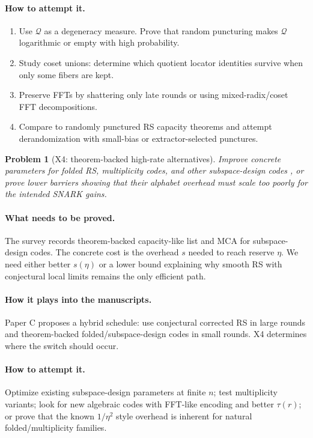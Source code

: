 \documentclass[11pt]{article}
\newtheorem{problem}[theorem]{Problem}
\theoremstyle{definition}
\theoremstyle{remark}
\newcommand{\Qprof}{\mathcal Q}
\newcommand{\paperC}{Paper C}
\begin{document}
\paragraph{How to attempt it.}
\begin{enumerate}[leftmargin=2.2em]
\item Use $\Qprof$ as a degeneracy measure.  Prove that random puncturing makes $\Qprof$ logarithmic or empty with high probability.
\item Study coset unions: determine which quotient locator identities survive when only some fibers are kept.
\item Preserve FFTs by shattering only late rounds or using mixed-radix/coset FFT decompositions.
\item Compare to randomly punctured RS capacity theorems \cite{AGL24} and attempt derandomization with small-bias or extractor-selected punctures.
\end{enumerate}

\begin{problem}[X4: theorem-backed high-rate alternatives]
\label{prob:X4}
Improve concrete parameters for folded RS, multiplicity codes, and other subspace-design codes \cite{CZ25,GG25}, or prove lower barriers showing that their alphabet overhead must scale too poorly for the intended SNARK gains.
\end{problem}

\paragraph{What needs to be proved.}  The survey records theorem-backed capacity-like list and MCA for subspace-design codes.  The concrete cost is the overhead $s$ needed to reach reserve $\eta$.  We need either better $s(\eta)$ or a lower bound explaining why smooth RS with conjectural local limits remains the only efficient path.

\paragraph{How it plays into the manuscripts.}  \paperC{} proposes a hybrid schedule: use conjectural corrected RS in large rounds and theorem-backed folded/subspace-design codes in small rounds.  X4 determines where the switch should occur.

\paragraph{How to attempt it.}  Optimize existing subspace-design parameters at finite $n$; test multiplicity variants; look for new algebraic codes with FFT-like encoding and better $\tau(r)$; or prove that the known $1/\eta^2$ style overhead is inherent for natural folded/multiplicity families.
\end{document}
